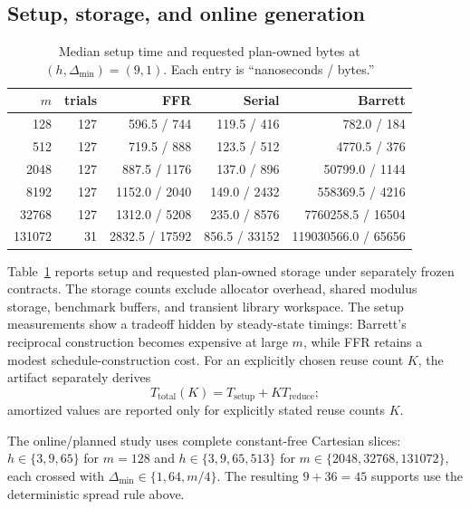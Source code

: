 \documentclass{mcom-l}
\numberwithin{equation}{section}
\theoremstyle{definition}
\theoremstyle{remark}
\newcommand{\Dmin}{\Delta_{\min}}
\begin{document}
\FloatBarrier
\subsection{Setup, storage, and online generation}

\begin{table}[t]
\caption{Median setup time and requested plan-owned bytes at
$(h,\Dmin)=(9,1)$.  Each entry is ``nanoseconds / bytes.''}
\label{tab:setup-storage}
\centering
\small
\begin{tabular}{@{}rrrrr@{}}
\toprule
$m$ & trials & FFR & Serial & Barrett\\
\midrule
128    & 127 & 596.5 / 744    & 119.5 / 416   & 782.0 / 184\\
\midrule
512    & 127 & 719.5 / 888    & 123.5 / 512   & 4770.5 / 376\\
\midrule
2048   & 127 & 887.5 / 1176   & 137.0 / 896   & 50799.0 / 1144\\
\midrule
8192   & 127 & 1152.0 / 2040  & 149.0 / 2432  & 558369.5 / 4216\\
\midrule
32768  & 127 & 1312.0 / 5208  & 235.0 / 8576  & 7760258.5 / 16504\\
\midrule
131072 & 31  & 2832.5 / 17592 & 856.5 / 33152 & 119030566.0 / 65656\\
\bottomrule
\end{tabular}
\end{table}

Table~\ref{tab:setup-storage} reports setup and requested plan-owned storage
under separately frozen contracts.
The storage counts exclude allocator overhead, shared modulus storage,
benchmark buffers, and transient library workspace.
The setup measurements show a tradeoff hidden by steady-state timings:
Barrett's reciprocal construction becomes expensive at large $m$, while FFR
retains a modest schedule-construction cost.  For an explicitly chosen reuse
count $K$, the artifact separately derives
\[
  T_{\mathrm{total}}(K)=T_{\mathrm{setup}}+K T_{\mathrm{reduce}};
\]
amortized values are reported only for explicitly stated reuse counts $K$.

The online/planned study uses complete constant-free Cartesian slices:
$h\in\{3,9,65\}$ for $m=128$ and $h\in\{3,9,65,513\}$ for
$m\in\{2048,32768,131072\}$, each crossed with
$\Dmin\in\{1,64,m/4\}$.  The resulting $9+36=45$ supports use the
deterministic spread rule above.
\end{document}
